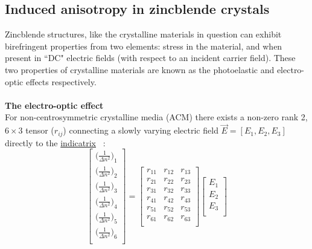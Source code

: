 \subsection{Induced anisotropy in zincblende crystals}
Zincblende structures, like the crystalline materials in question can exhibit birefringent properties from two elements: stress in the material, and when present in ``DC" electric fields (with respect to an incident carrier field). These two properties of crystalline materials are known as the photoelastic and electro-optic effects respectively.
\\
\\
\noindent \textbf{The electro-optic effect}
\\
For non-centrosymmetric crystalline media (ACM) there exists a non-zero rank 2, $6 \times 3$ tensor ($r_{ij}$) connecting a slowly varying electric field $\vec{E} = [E_1, E_2, E_3]$ directly to the \hyperref[sec:indicatrix]{indicatrix} ~\cite{yariv,nye}:
\begin{equation}
  \left[ {\begin{array}{c}
   \big( \frac{1}{\Delta n ^2 } \big)_1 \\
   \big( \frac{1}{\Delta n ^2 } \big)_2 \\
   \big( \frac{1}{\Delta n ^2 } \big)_3 \\
   \big( \frac{1}{\Delta n ^2 } \big)_4 \\
   \big( \frac{1}{\Delta n ^2 } \big)_5 \\
   \big( \frac{1}{\Delta n ^2 } \big)_6 \\
  \end{array} } \right]
  =
%
 \left[ {\begin{array}{ccc}
   r_{11} & r_{12} & r_{13}\\
   r_{21} & r_{22} & r_{23}\\
   r_{31} & r_{32} & r_{33}\\
   r_{41} & r_{42} & r_{43}\\
   r_{51} & r_{52} & r_{53}\\
   r_{61} & r_{62} & r_{63}\\
  \end{array}} \right]
 \left[{\begin{array}{c}
   E_1\\
   E_2\\
   E_3\\
 \end{array}} \right]
\end{equation}

